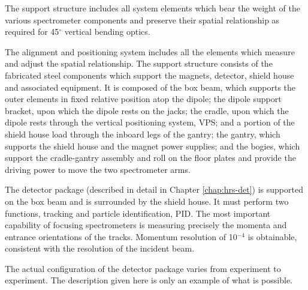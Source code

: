 {The support structure includes all system elements which bear the weight 
of the various spectrometer components and preserve their spatial 
relationship as required for 45$^{\circ}$ vertical bending optics.

The alignment and positioning system includes all the elements which 
measure and adjust the spatial relationship.  The support structure 
consists of the fabricated steel components which support the magnets, 
detector, shield house and associated equipment.  It is composed of the 
box beam, which supports the outer elements in fixed relative position 
atop the dipole; the dipole support bracket, upon which the dipole rests on 
the jacks; the cradle, upon which the dipole rests through the vertical 
positioning system, VPS; and a portion of the shield house load through 
the inboard legs of the gantry; the gantry, which supports the shield 
house and the magnet power supplies; and the bogies, which support the 
cradle-gantry assembly and roll on the floor plates and provide the 
driving power to move the two spectrometer arms.

The detector package (described in detail in Chapter \ref{chap:hrs-det})
is supported on the box beam and is surrounded by 
the shield house.  It must perform two functions, tracking and particle 
identification, PID.  The most important capability of focusing 
spectrometers is measuring precisely the momenta and entrance 
orientations of the tracks.  Momentum resolution of 10$^{-4}$ is 
obtainable, consistent with the resolution of the incident beam.

The actual configuration of the detector package varies from experiment to
experiment. The description given here is only an example of what is possible.
}

